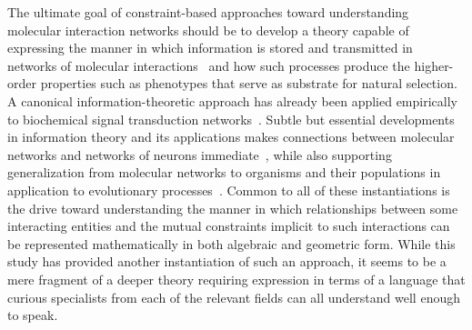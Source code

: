 The ultimate goal of constraint-based approaches toward understanding molecular interaction networks should be to develop a theory capable of expressing the manner in which information is stored and transmitted in networks of molecular interactions~\cite{Tkacik2011a,Bialek2012} and how such processes produce the higher-order properties such as phenotypes that serve as substrate for natural selection. A canonical information-theoretic approach has already been applied empirically to biochemical signal transduction networks~\cite{Cheong2011,Brennan2012}. Subtle but essential developments in information theory and its applications makes connections between molecular networks and networks of neurons immediate~\cite{Stanley1999,Balduzzi2008,Balduzzi2009,Balduzzi2012}, while also supporting generalization from molecular networks to organisms and their populations in application to evolutionary processes~\cite{Kussell2005a,Rivoire2011}. Common to all of these instantiations is the drive toward understanding the manner in which relationships between some interacting entities and the mutual constraints implicit to such interactions can be represented mathematically in both algebraic and geometric form. While this study has provided another instantiation of such an approach, it seems to be a mere fragment of a deeper theory requiring expression in terms of a language that curious specialists from each of the relevant fields can all understand well enough to speak.
